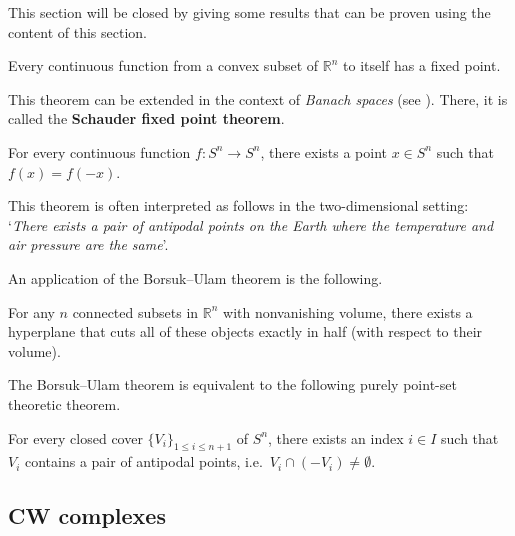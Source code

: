     This section will be closed by giving some results that can be proven using the content of this section.
    \begin{theorem}
        Every continuous function from a convex subset of $\mathbb{R}^n$ to itself has a fixed point.
    \end{theorem}
    This theorem can be extended in the context of \textit{Banach spaces} (see ). There, it is called the \textbf{Schauder fixed point theorem}.

    \begin{theorem}
        For every continuous function $f:S^n\rightarrow S^n$, there exists a point $x\in S^n$ such that $f(x)=f(-x)$.
    \end{theorem}
    This theorem is often interpreted as follows in the two-dimensional setting: `\textit{There exists a pair of antipodal points on the Earth where the temperature and air pressure are the same}'.

    An application of the Borsuk--Ulam theorem is the following.
    \begin{theorem}
        For any $n$ connected subsets in $\mathbb{R}^n$ with nonvanishing volume, there exists a hyperplane that cuts all of these objects exactly in half (with respect to their volume).
    \end{theorem}

    The Borsuk--Ulam theorem is equivalent to the following purely point-set theoretic theorem.
    \begin{theorem}
        For every closed cover $\{V_i\}_{1\leq i\leq n+1}$ of $S^n$, there exists an index $i\in I$ such that $V_i$ contains a pair of antipodal points, i.e.~$V_i\cap(-V_i)\neq\emptyset$.
    \end{theorem}

\subsection{CW complexes}\label{section:cw_complex}


